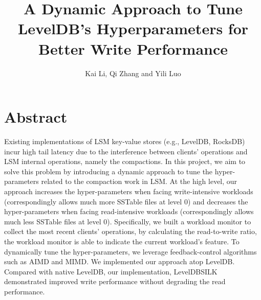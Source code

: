 \documentclass[letter,twocolumn,10pt]{article}
\begin{document}
\date{}

\title{\Large \textbf{A Dynamic Approach to Tune LevelDB’s Hyperparameters for Better Write Performance}}
\author{Kai Li, Qi Zhang and Yili Luo}
\maketitle

\section*{Abstract}
Existing implementations of LSM key-value stores (e.g., LevelDB, RocksDB) incur high tail latency due to the interference between clients’ operations and LSM internal operations, namely the compactions. In this project, we aim to solve this problem by introducing a dynamic approach to tune the hyper-parameters related to the compaction work in LSM. At the high level, our approach increases the hyper-parameters when facing write-intensive workloads (correspondingly allows much more SSTable files at level 0) and decreases the hyper-parameters when facing read-intensive workloads (correspondingly allows much less SSTable files at level 0). Specifically, we built a workload monitor to collect the most recent clients’ operations, by calculating the read-to-write ratio, the workload monitor is able to indicate the current workload’s feature. To dynamically tune the hyper-parameters, we leverage feedback-control algorithms such as AIMD and MIMD. We implemented our approach atop LevelDB. Compared with native LevelDB, our implementation, LevelDBSILK demonstrated improved write performance without degrading the read performance.
\end{document}
